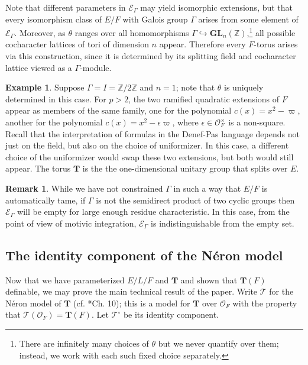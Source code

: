 \documentclass{amsart}
\newcommand{\Z}{{\mathbb Z}}
\newcommand{\ri}{\mathcal{O}}
\newcommand{\GL}{\mathbf {GL}}
\newcommand{\bT}{\mathbf {T}}
\newcommand\cE{{\mathcal E}}
\newcommand{\Ner}[1]{\mathcal{#1}}
\newcommand{\NerC}[1]{\mathcal{#1}^\circ}
\theoremstyle{plain}
\theoremstyle{definition}
\newtheorem{rem}[thm]{Remark}
\newtheorem{example}[thm]{Example}
\begin{document}
Note that different parameters in $\cE_\Gamma$ may yield isomorphic extensions,
but that every isomorphism class of $E/F$ with Galois group $\Gamma$
arises from some element of $\cE_\Gamma$.  Moreover, as $\theta$ ranges over all homomorphisms
$\Gamma \hookrightarrow \GL_n(\Z)$,\footnote{There are infinitely many choices of $\theta$
but we never quantify over them; instead, we work with each such fixed choice separately.}
all possible cocharacter lattices of tori of dimension $n$ appear. Therefore every $F$-torus
arises via this construction, since it is determined by its splitting field and cocharacter lattice viewed as a $\Gamma$-module. 
\begin{example}
Suppose $\Gamma = I = \Z / 2\Z$ and $n=1$; note that $\theta$ is uniquely determined in this case.
For $p > 2$, the two ramified quadratic extensions of $F$ appear as members of the same family,
one for the polynomial $c(x) = x^2-\varpi$, another for the polynomial $c(x) = x^2-\epsilon\varpi$,
where $\epsilon \in \ri_F^\times$ is a non-square.
Recall that the interpretation of formulas in the Denef-Pas language depends not just on the field,
but also on the choice of uniformizer. In this case, a different choice of the uniformizer
would swap these two extensions, but both would still appear.
The torus $\bT$ is the the one-dimensional unitary group that splits over $E$.
\end{example}
\begin{rem}
While we have not constrained $\Gamma$ in such a way that $E/F$ is automatically tame,
if $\Gamma$ is not the semidirect product of two cyclic groups then
$\cE_\Gamma$ will be empty for large enough residue characteristic.  In this case, from the point of view
of motivic integration, $\cE_\Gamma$ is indistinguishable from the empty set.
\end{rem}

\subsection{The identity component of the N\'eron model} \label{sub:NerCdefinable}

Now that we have parameterized $E/L/F$ and $\bT$ and shown that $\bT(F)$ definable, we may prove the main technical result of the paper.
Write $\Ner{T}$ for the N\'eron model of $\bT$ (cf. \cite{bosch-lutkebohmert-raynaud:neron}*{Ch. 10});
this is a model for $\bT$ over $\ri_F$ with the property that $\Ner{T}(\ri_F) = \bT(F)$.  Let $\NerC{T}$ be its identity component.
\end{document}
